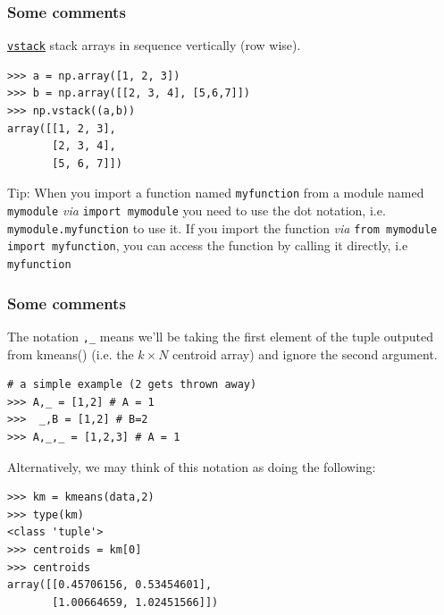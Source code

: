 \documentclass[xcolor=svgnames, handout]{beamer}
\newcommand{\ft}[1]{\frametitle{#1}}
\begin{document}
\begin{frame}[fragile]\ft{Some comments}

\href{https://docs.scipy.org/doc/numpy/reference/generated/numpy.vstack.html}{\tt vstack} stack arrays in sequence vertically (row wise).
\begin{Verbatim}[frame=single]
>>> a = np.array([1, 2, 3])
>>> b = np.array([[2, 3, 4], [5,6,7]])
>>> np.vstack((a,b))
array([[1, 2, 3],
       [2, 3, 4],
       [5, 6, 7]])
\end{Verbatim}

\begin{block}{Tip:}
When you import a function named {\tt myfunction} from a module named {\tt mymodule} \textit{via} \verb|import mymodule| you need to use the dot notation, i.e. \verb|mymodule.myfunction| to use it.  If you import the function \textit{via} \verb|from mymodule import myfunction|, you can access the function by calling it directly, i.e \verb|myfunction| 
\end{block}


\end{frame}


\begin{frame}[fragile]\ft{Some comments}
The notation {\tt ,\_} means we'll be taking the first element of the tuple outputed from kmeans() (i.e. the $k\times N$ centroid array) and ignore the second argument.
\begin{Verbatim}[xleftmargin=0.2in, frame=single]
# a simple example (2 gets thrown away)
>>> A,_ = [1,2] # A = 1
>>>  _,B = [1,2] # B=2
>>> A,_,_ = [1,2,3] # A = 1
\end{Verbatim}

Alternatively, we may think of this notation as doing the following:
\begin{Verbatim}[xleftmargin=0.2in, frame=single]
>>> km = kmeans(data,2)
>>> type(km)
<class 'tuple'>
>>> centroids = km[0]
>>> centroids
array([[0.45706156, 0.53454601],
       [1.00664659, 1.02451566]])
\end{Verbatim}
\end{frame}
\end{document}
